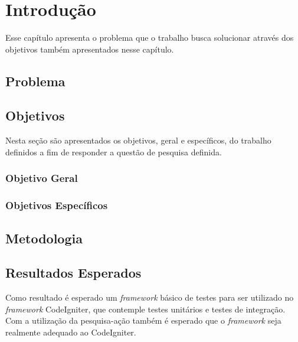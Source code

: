 \chapter[Introdução]{Introdução}

Esse capítulo apresenta o problema que o trabalho busca solucionar através dos objetivos também apresentados nesse capítulo.

\section{Problema}

  
\section{Objetivos}

  Nesta seção são apresentados os objetivos, geral e específicos, do trabalho definidos a fim de responder a questão de pesquisa definida.

\subsection{Objetivo Geral}


\subsection{Objetivos Específicos}


\section{Metodologia}

	

\section{Resultados Esperados}

Como resultado é esperado um \textit{framework} básico de testes para ser utilizado no \textit{framework} CodeIgniter, que contemple
testes unitários e testes de integração. Com a utilização da pesquisa-ação também é esperado que o \textit{framework} seja realmente adequado
ao CodeIgniter. 

